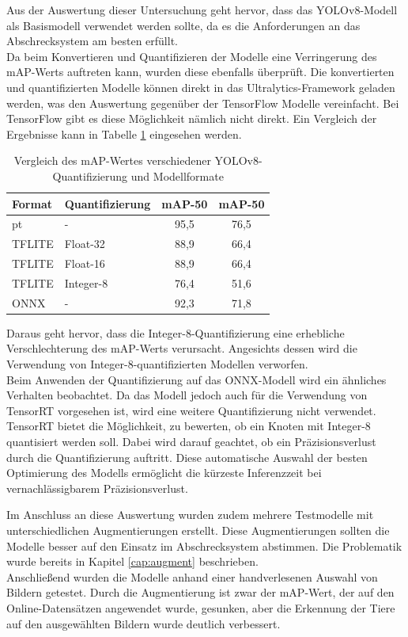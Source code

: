 Aus der Auswertung dieser Untersuchung geht hervor, dass das YOLOv8-Modell als Basismodell verwendet werden sollte, da es die Anforderungen an das Abschrecksystem am besten erfüllt.
\\
Da beim Konvertieren und Quantifizieren der Modelle eine Verringerung des \ac{mAP}-Werts auftreten kann, wurden diese ebenfalls überprüft. Die konvertierten und quantifizierten Modelle können direkt in das Ultralytics-Framework geladen werden, was den Auswertung gegenüber der TensorFlow Modelle vereinfacht. Bei TensorFlow gibt es diese Möglichkeit nämlich nicht direkt. Ein Vergleich der Ergebnisse kann in Tabelle \ref{tab:map_yolo} eingesehen werden.

\begin{table}[h]
    \centering
    \begin{tabular}{llcc}
        \textbf{Format} & \textbf{Quantifizierung} & \textbf{\ac{mAP}-50} & \textbf{\ac{mAP}-50}\\
        \hline
        pt & - & 95,5 & 76,5\\
        TFLITE & Float-32 & 88,9 & 66,4 \\
        TFLITE & Float-16 & 88,9 & 66,4\\
        TFLITE & Integer-8 & 76,4 & 51,6\\
        ONNX & - & 92,3 & 71,8\\
    \end{tabular}
    \caption{Vergleich des \ac{mAP}-Wertes verschiedener YOLOv8-Quantifizierung und Modellformate}
    \label{tab:map_yolo}
\end{table}

Daraus geht hervor, dass die Integer-8-Quantifizierung eine erhebliche Verschlechterung des \ac{mAP}-Werts verursacht. Angesichts dessen wird die Verwendung von Integer-8-quantifizierten Modellen verworfen.
\\
Beim Anwenden der Quantifizierung auf das ONNX-Modell wird ein ähnliches Verhalten beobachtet. Da das Modell jedoch auch für die Verwendung von TensorRT vorgesehen ist, wird eine weitere Quantifizierung nicht verwendet. TensorRT bietet die Möglichkeit, zu bewerten, ob ein Knoten mit Integer-8 quantisiert werden soll. Dabei wird darauf geachtet, ob ein Präzisionsverlust durch die Quantifizierung auftritt. Diese automatische Auswahl der besten Optimierung des Modells ermöglicht die kürzeste Inferenzzeit bei vernachlässigbarem Präzisionsverlust.

Im Anschluss an diese Auswertung wurden zudem mehrere Testmodelle mit unterschiedlichen Augmentierungen erstellt. Diese Augmentierungen sollten die Modelle besser auf den Einsatz im Abschrecksystem abstimmen. Die Problematik wurde bereits in Kapitel \ref{cap:augment} beschrieben.
\\
Anschließend wurden die Modelle anhand einer handverlesenen Auswahl von Bildern getestet. Durch die Augmentierung ist zwar der \ac{mAP}-Wert, der auf den Online-Datensätzen angewendet wurde, gesunken, aber die Erkennung der Tiere auf den ausgewählten Bildern wurde deutlich verbessert.

